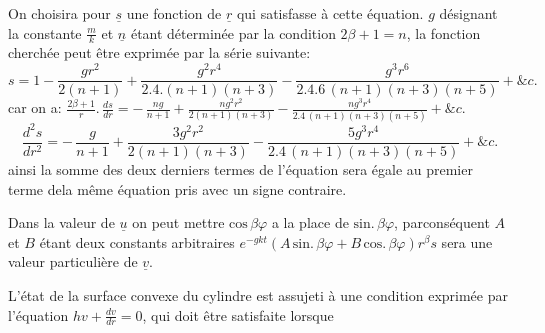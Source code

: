 \documentclass[11pt,a4paper]{article}
\begin{document}
On choisira pour $\underline{s}$ une fonction de $\underline{r}$ qui satisfasse à cette
équation.
$g$ désignant la constante $\frac{m}{k}$ et $\underline{n}$ étant déterminée par la
condition $2\beta + 1 = n$, la fonction cherchée peut être exprimée
par la série suivante:
\[ s = 1 - \frac{gr^{2}}{2(n+1)} + \frac{g^{2}r^{4}}{2.4.(n+1)(n+3)} - \frac{g^{3}r^{6}}{2.4.6\,(n+1)(n+3)(n+5)} + \&c. \]
car on a: \quad $\frac{2\beta+1}{r}.\,\frac{ds}{dr} = -\,\frac{ng}{n+1} + \frac{ng^{2}r^{2}}{2(n+1)(n+3)} - \frac{ng^{3}r^{4}}{2.4\,(n+1)(n+3)(n+5)} + \&c.$
\[ \frac{d^{2}s}{dr^{2}} = -\,\frac{g}{n+1} + \frac{3g^{2}r^{2}}{2(n+1)(n+3)} - \frac{5g^{3}r^{4}}{2.4\,(n+1)(n+3)(n+5)} + \&c. \]
ainsi la somme des deux derniers termes de l'équation
sera égale au premier terme dela même équation pris
avec un signe contraire.

Dans la valeur de $\underline{u}$ on peut  mettre
 $\text{cos}\,\beta\varphi$ a la place de $\text{sin.}\,\beta\varphi$, parconséquent
$A$ et $B$ étant deux constants arbitraires
$e^{-gkt}\left(A\,\text{sin.}\,\beta\varphi + B\,\text{cos.}\,\beta\varphi\right)r^{\beta}s$ sera une valeur particulière
de $\underline{v}$.

L'état de la surface convexe du cylindre est
assujeti à une condition exprimée par l'équation
$hv + \frac{dv}{dr} = 0$, qui doit être satisfaite lorsque
\end{document}
